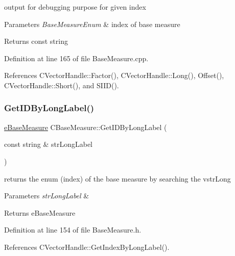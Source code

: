 output for debugging purpose for given index 


\begin{DoxyParams}{Parameters}
{\em Base\+Measure\+Enum} & index of base measure \\
\hline
\end{DoxyParams}
\begin{DoxyReturn}{Returns}
const string 
\end{DoxyReturn}


Definition at line 165 of file Base\+Measure.\+cpp.



References C\+Vector\+Handle\+::\+Factor(), C\+Vector\+Handle\+::\+Long(), Offset(), C\+Vector\+Handle\+::\+Short(), and S\+I\+I\+D().

\mbox{\label{classCBaseMeasure_a5c55d072ffe8e9b5fbe7713039987084}} 
\subsubsection{\texorpdfstring{Get\+I\+D\+By\+Long\+Label()}{GetIDByLongLabel()}}
{\footnotesize\ttfamily \hyperlink{BaseMeasure_8h_ac90e5164ccf1f0d648fba7e94b229a11}{e\+Base\+Measure} C\+Base\+Measure\+::\+Get\+I\+D\+By\+Long\+Label (\begin{DoxyParamCaption}\item[{const string \&}]{str\+Long\+Label }\end{DoxyParamCaption})\hspace{0.3cm}{\ttfamily [inline]}}



returns the enum (index) of the base measure by searching the vstr\+Long 


\begin{DoxyParams}{Parameters}
{\em str\+Long\+Label} & \\
\hline
\end{DoxyParams}
\begin{DoxyReturn}{Returns}
e\+Base\+Measure 
\end{DoxyReturn}


Definition at line 154 of file Base\+Measure.\+h.



References C\+Vector\+Handle\+::\+Get\+Index\+By\+Long\+Label().

